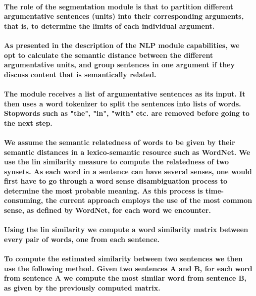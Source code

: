 \documentclass[lnbip]{svmultln}
\begin{document}
\paragraph*{The role of the segmentation module is that to partition different argumentative sentences (units) into their corresponding arguments, that is, to determine the limits of each individual argument.}
\paragraph*{As presented in the description of the NLP module capabilities, we opt to calculate the semantic distance between the different argumentative units, and group sentences in one argument if they discuss content that is semantically related.}
\paragraph*{The module receives a list of argumentative sentences as its input. It then uses a word tokenizer to split the sentences into lists of words. Stopwords such as "the", "in", "with" etc. are removed before going to the next step.}
\paragraph*{We assume the semantic relatedness of words to be given by their semantic distances in a lexico-semantic resource such as WordNet. We use the lin similarity measure to compute the relatedness of two synsets. As each word in a sentence can have several senses, one would first have to go through a word sense disambiguation process to determine the most probable meaning. As this process is time-consuming, the current approach employs the use of the most common sense, as defined by WordNet, for each word we encounter.}
\paragraph*{Using the lin similarity we compute a word similarity matrix between every pair of words, one from each sentence.}
\paragraph*{To compute the estimated similarity between two sentences we then use the following method. Given two sentences A and B, for each word from sentence A we compute the most similar word from sentence B, as given by the previously computed matrix.}
\end{document}
